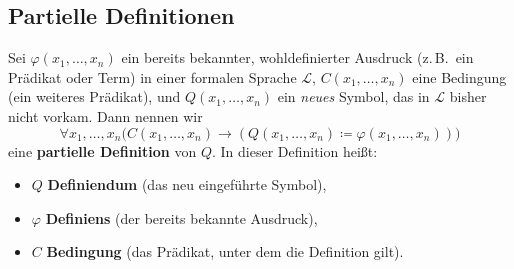 \documentclass[main.tex]{subfiles}
\begin{document}
\subsection{Partielle Definitionen}
\begin{definition}
Sei \(\varphi(x_1,\dots,x_n)\) ein bereits bekannter, wohldefinierter Ausdruck (z.\,B.\ ein Prädikat oder Term) in einer formalen Sprache \(\mathcal{L}\), \(C(x_1,\dots,x_n)\) eine Bedingung (ein weiteres Prädikat), und \(Q(x_1,\dots,x_n)\) ein \emph{neues} Symbol, das in \(\mathcal{L}\) bisher nicht vorkam. Dann nennen wir
\[
\forall x_1,\dots,x_n \bigl( C(x_1,\dots,x_n) \rightarrow ( Q(x_1,\dots,x_n) \coloneqq \varphi(x_1,\dots,x_n) ) \bigr)
\]
eine \textbf{partielle Definition} von \(Q\). In dieser Definition heißt:
\begin{itemize}
    \item \(Q\) \textbf{Definiendum} (das neu eingeführte Symbol),
    \item \(\varphi\) \textbf{Definiens} (der bereits bekannte Ausdruck),
    \item \(C\) \textbf{Bedingung} (das Prädikat, unter dem die Definition gilt).
\end{itemize}

\noindent

\end{definition}
\end{document}
